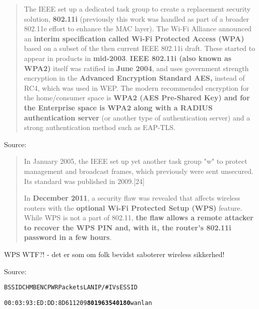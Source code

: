 \documentclass[Screen16to9,17pt]{foils}
\begin{document}

\begin{quote}
The IEEE set up a dedicated task group to create a replacement security solution, {\bf 802.11i} (previously this work was handled as part of a broader 802.11e effort to enhance the MAC layer). The Wi-Fi Alliance announced an {\bf interim specification called Wi-Fi Protected Access (WPA)} based on a subset of the then current IEEE 802.11i draft. These started to appear in products in {\bf mid-2003}. {\bf IEEE 802.11i (also known as WPA2)} itself was ratified in {\bf June 2004}, and uses government strength encryption in the {\bf Advanced Encryption Standard AES,} instead of RC4, which was used in WEP. The modern recommended encryption for the home/consumer space is {\bf WPA2 (AES Pre-Shared Key) and for the Enterprise space is WPA2 along with a RADIUS authentication server} (or another type of authentication server) and a strong authentication method such as EAP-TLS.
\end{quote}
Source: 


\begin{quote}
In January 2005, the IEEE set up yet another task group "w" to protect management and broadcast frames, which previously were sent unsecured. Its standard was published in 2009.[24]

In {\bf December 2011}, a security flaw was revealed that affects wireless routers with the {\bf optional Wi-Fi Protected Setup (WPS)} feature. While WPS is not a part of 802.11, {\bf the flaw allows a remote attacker to recover the WPS PIN and, with it, the router's 802.11i password in a few hours}.
\end{quote}

\vskip 2cm
\centerline{WPS WTF?! - det er som om folk bevidst saboterer wireless sikkerhed!}
\vskip 2cm

Source: 







\begin{alltt}
\hlktiny
   BSSID              CH  MB  ENC  PWR  Packets   LAN IP / # IVs   ESSID

   00:03:93:ED:DD:8D   6  11       209   {\bf 801963                  540180}   wanlan
\end{alltt}
\end{document}
